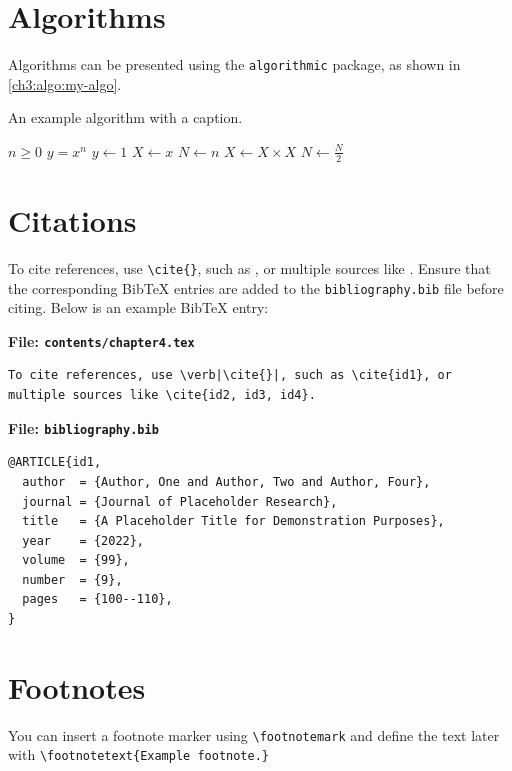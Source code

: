 \section{Algorithms}
\begin{paragraph}
Algorithms can be presented using the \texttt{algorithmic} package, as shown in \autoref{ch3:algo:my-algo}.
\end{paragraph}

\begin{algorithm}[h]
\caption{An example algorithm with a caption.}
\label{ch3:algo:my-algo}
\small\singlespacing
\begin{algorithmic}[1]
    \Require $n \geq 0$
    \Ensure $y = x^n$
    \State $y \gets 1$
    \State $X \gets x$
    \State $N \gets n$
            \State $X \gets X \times X$
            \State $N \gets \frac{N}{2}$ 
    \EndWhile
\end{algorithmic}
\end{algorithm}



\section{Citations}
\begin{paragraph}
To cite references, use \verb|\cite{}|, such as \cite{id1}, or multiple sources like \cite{id2, id3, id4}. Ensure that the corresponding BibTeX entries are added to the \texttt{bibliography.bib} file before citing. Below is an example BibTeX entry:
\end{paragraph}

\noindent\textbf{File: \texttt{contents/chapter4.tex}}\vspace{-1em}
\begin{verbatim}
To cite references, use \verb|\cite{}|, such as \cite{id1}, or multiple sources like \cite{id2, id3, id4}.
\end{verbatim}

\noindent\textbf{File: \texttt{bibliography.bib}}\vspace{-1em}
\begin{verbatim}
@ARTICLE{id1,
  author  = {Author, One and Author, Two and Author, Four},
  journal = {Journal of Placeholder Research}, 
  title   = {A Placeholder Title for Demonstration Purposes}, 
  year    = {2022},
  volume  = {99},
  number  = {9},
  pages   = {100--110},
}
\end{verbatim}

\section{Footnotes}
\begin{paragraph}
You can insert a footnote marker using \verb|\footnotemark|\footnotemark{} and define the text later with \verb|\footnotetext{Example footnote.}|
\end{paragraph}